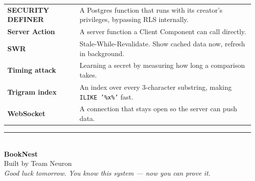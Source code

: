 \documentclass[11pt,a4paper]{article}
\begin{document}
\begin{longtable}{@{}p{4.0cm}p{10.8cm}@{}}
\textbf{SECURITY DEFINER} & A Postgres function that runs with its creator's
privileges, bypassing RLS internally. \\
\textbf{Server Action} & A server function a Client Component can call directly. \\
\textbf{SWR} & Stale-While-Revalidate. Show cached data now, refresh in background. \\
\textbf{Timing attack} & Learning a secret by measuring how long a comparison takes. \\
\textbf{Trigram index} & An index over every 3-character substring, making
\texttt{ILIKE '\%x\%'} fast. \\
\textbf{WebSocket} & A connection that stays open so the server can push data. \\
\bottomrule
\end{longtable}

\vspace{1.2cm}
\begin{center}
\rule{0.5\textwidth}{0.6pt}\\[8pt]
{\large\color{primary}\textbf{BookNest}}\\[3pt]
{\small Built by Team Neuron}\\[10pt]
\emph{Good luck tomorrow. You know this system --- now you can prove it.}
\end{center}
\end{document}
